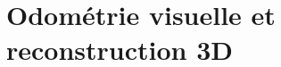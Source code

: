 \documentclass[11pt, a4paper]{book}
\begin{document}
\setcounter{tocdepth}{3}

\dominitoc
\tableofcontents

\setcounter{chapter}{3}
\chapter{Odométrie visuelle et reconstruction 3D}



\end{document}
